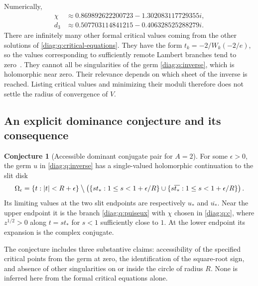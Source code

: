 \documentclass[11pt,a4paper]{article}
\theoremstyle{definition}
\newtheorem{conjecture}[theorem]{Conjecture}
\theoremstyle{remark}
\numberwithin{equation}{section}
\begin{document}
Numerically,
\begin{align*}
 \chi&\approx0.869892622200723-1.302083117729355i,\\
 d_3&\approx0.507703114841215-0.406328525288279i.
\end{align*}
There are infinitely many other formal critical values coming from the
other solutions of \eqref{diag:q:critical-equations}.  They have the form
$t_k=-2/W_k(-2/e)$, so the values corresponding to sufficiently remote
Lambert branches tend to zero~\cite[\S4.13]{DLMF}.
They cannot all be singularities of the germ \eqref{diag:q:inverse},
which is holomorphic near zero.  Their relevance depends on which sheet
of the inverse is reached.  Listing critical values and minimizing their
moduli therefore does not settle the radius of convergence of $V$.

\subsection{An explicit dominance conjecture and its consequence}
\label{diag:q:dominance-subsection}

\begin{conjecture}[Accessible dominant conjugate pair for $A=2$]
\label{diag:q:dominance}
For some $\epsilon>0$, the germ $u$ in \eqref{diag:q:inverse} has a
single-valued holomorphic continuation to the slit disk
\begin{equation}\label{diag:q:domain}
 \Omega_\epsilon=\{t:|t|<R+\epsilon\}
 \mathbin{\big\backslash}
 \left(
  \{s t_*:1\leq s<1+\epsilon/R\}
   \cup
  \{s\overline{t_*}:1\leq s<1+\epsilon/R\}
 \right).
\end{equation}
Its limiting values at the two slit endpoints are respectively $u_*$
and $\overline{u_*}$.  Near the upper endpoint it is the branch
\eqref{diag:q:puiseux} with $\chi$ chosen in \eqref{diag:q:c}, where
$z^{1/2}>0$ along $t=s t_*$ for $s<1$ sufficiently close to $1$.
At the lower endpoint its expansion is the complex conjugate.
\end{conjecture}

The conjecture includes three substantive claims: accessibility of the
specified critical points from the germ at zero, the identification of the
square-root sign, and absence of other singularities on or inside the
circle of radius $R$.  None is inferred here from the formal critical
equations alone.
\end{document}

